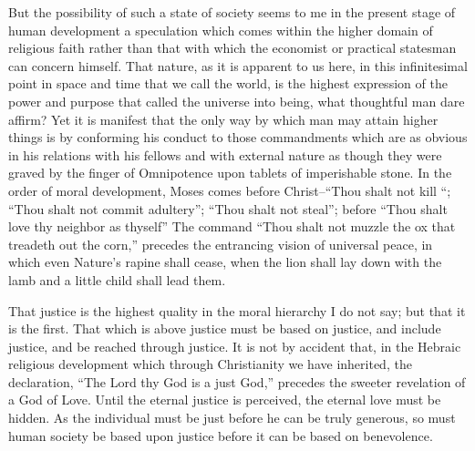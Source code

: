 \documentclass{book}
\begin{document}
But the possibility of such a state of society seems to me in the present stage of human development a speculation which comes within the higher domain of religious faith rather than that with which the economist or practical statesman can concern himself. That nature, as it is apparent to us here, in this infinitesimal point in space and time that we call the world, is the highest expression of the power and purpose that called the universe into being, what thoughtful man dare affirm? Yet it is manifest that the only way by which man may attain higher things is by conforming his conduct to those commandments which are as obvious in his relations with his fellows and with external nature as though they were graved by the finger of Omnipotence upon tablets of imperishable stone. In the order of moral development, Moses comes before Christ–“Thou shalt not kill “; “Thou shalt not commit adultery”; “Thou shalt not steal”; before “Thou shalt love thy neighbor as thyself” The command “Thou shalt not muzzle the ox that treadeth out the corn,” precedes the entrancing vision of universal peace, in which even Nature’s rapine shall cease, when the lion shall lay down with the lamb and a little child shall lead them.

That justice is the highest quality in the moral hierarchy I do not say; but that it is the first. That which is above justice must be based on justice, and include justice, and be reached through justice. It is not by accident that, in the Hebraic religious development which through Christianity we have inherited, the declaration, “The Lord thy God is a just God,” precedes the sweeter revelation of a God of Love. Until the eternal justice is perceived, the eternal love must be hidden. As the individual must be just before he can be truly generous, so must human society be based upon justice before it can be based on benevolence.
\end{document}
